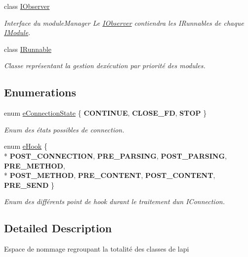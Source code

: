 \begin{DoxyCompactItemize}
class \hyperlink{class_a_p_i_tree_friends_1_1_i_observer}{I\+Observer}
\begin{DoxyCompactList}\small\item\em Interface du module\+Manager Le \hyperlink{class_a_p_i_tree_friends_1_1_i_observer}{I\+Observer} contiendra les I\+Runnables de chaque \hyperlink{class_a_p_i_tree_friends_1_1_i_module}{I\+Module}. \end{DoxyCompactList}\item 
class \hyperlink{class_a_p_i_tree_friends_1_1_i_runnable}{I\+Runnable}
\begin{DoxyCompactList}\small\item\em Classe représentant la gestion d\textquotesingle{}exécution par priorité des modules. \end{DoxyCompactList}\end{DoxyCompactItemize}
\subsection*{Enumerations}
\begin{DoxyCompactItemize}
\item 
\hypertarget{namespace_a_p_i_tree_friends_a746fed077303e8587bfa0e8f2dbf4997}{}enum \hyperlink{namespace_a_p_i_tree_friends_a746fed077303e8587bfa0e8f2dbf4997}{e\+Connection\+State} \{ {\bfseries C\+O\+N\+T\+I\+N\+U\+E}, 
{\bfseries C\+L\+O\+S\+E\+\_\+\+F\+D}, 
{\bfseries S\+T\+O\+P}
 \}\label{namespace_a_p_i_tree_friends_a746fed077303e8587bfa0e8f2dbf4997}

\begin{DoxyCompactList}\small\item\em Enum des états possibles de connection. \end{DoxyCompactList}\item 
\hypertarget{namespace_a_p_i_tree_friends_a3943902c0fe96b820b0261e510dcb720}{}enum \hyperlink{namespace_a_p_i_tree_friends_a3943902c0fe96b820b0261e510dcb720}{e\+Hook} \{ \\*
{\bfseries P\+O\+S\+T\+\_\+\+C\+O\+N\+N\+E\+C\+T\+I\+O\+N}, 
{\bfseries P\+R\+E\+\_\+\+P\+A\+R\+S\+I\+N\+G}, 
{\bfseries P\+O\+S\+T\+\_\+\+P\+A\+R\+S\+I\+N\+G}, 
{\bfseries P\+R\+E\+\_\+\+M\+E\+T\+H\+O\+D}, 
\\*
{\bfseries P\+O\+S\+T\+\_\+\+M\+E\+T\+H\+O\+D}, 
{\bfseries P\+R\+E\+\_\+\+C\+O\+N\+T\+E\+N\+T}, 
{\bfseries P\+O\+S\+T\+\_\+\+C\+O\+N\+T\+E\+N\+T}, 
{\bfseries P\+R\+E\+\_\+\+S\+E\+N\+D}
 \}\label{namespace_a_p_i_tree_friends_a3943902c0fe96b820b0261e510dcb720}

\begin{DoxyCompactList}\small\item\em Enum des différents point de hook durant le traitement d\textquotesingle{}un I\+Connection. \end{DoxyCompactList}\end{DoxyCompactItemize}


\subsection{Detailed Description}
Espace de nommage regroupant la totalité des classes de l\textquotesingle{}api 